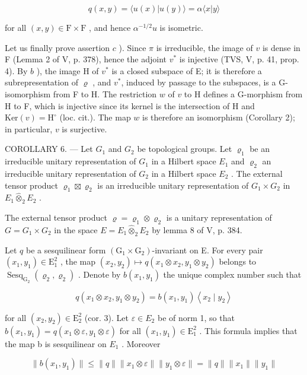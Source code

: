 \[
q (x, y) = \langle u (x) | u (y) \rangle = \alpha \langle x | y \rangle
\]

for all \((x,y)\in\mathrm{F}\times\mathrm{F}\) , and hence \(\alpha^{-1/2}u\) is isometric.

Let us finally prove assertion \(c\) ). Since \(\pi\) is irreducible, the image of \(v\) is dense in F (Lemma 2 of V, p. 378), hence the adjoint \(v^*\) is injective (TVS, V, p. 41, prop. 4). By \(b\) ), the image H of \(v^*\) is a closed subspace of E; it is therefore a subrepresentation of \(\varrho\) , and \(v^*\), induced by passage to the subspaces, is a G-isomorphism from F to H. The restriction \(w\) of \(v\) to H defines a G-morphism from H to F, which is injective since its kernel is the intersection of H and \(\text{Ker}(v) = \text{H}^\circ\) (loc. cit.). The map \(w\) is therefore an isomorphism (Corollary 2); in particular, \(v\) is surjective.

COROLLARY 6. --- Let \(G_{1}\) and \(G_{2}\) be topological groups. Let \(\varrho_{1}\) be an irreducible unitary representation of \(G_{1}\) in a Hilbert space \(E_{1}\) and \(\varrho_{2}\) an irreducible unitary representation of \(G_{2}\) in a Hilbert space \(E_{2}\) . The external tensor product \(\varrho_{1} \boxtimes \varrho_{2}\) is an irreducible unitary representation of \(G_{1} \times G_{2}\) in \(E_{1} \widehat{\otimes}_{2} E_{2}\) .

The external tensor product \(\varrho = \varrho_{1} \otimes \varrho_{2}\) is a unitary representation of \(G = G_{1} \times G_{2}\) in the space \(E = E_{1} \widehat{\otimes}_{2} E_{2}\) by lemma 8 of V, p. 384.

Let \(q\) be a sesquilinear form \((\mathrm{G}_1 \times \mathrm{G}_2)\)-invariant on E. For every pair \((x_1, y_1) \in \mathrm{E}_1^2\) , the map \((x_2, y_2) \mapsto q(x_1 \otimes x_2, y_1 \otimes y_2)\) belongs to \(\operatorname{Sesq}_{\mathrm{G}_2}(\varrho_2, \varrho_2)\) . Denote by \(b(x_1, y_1)\) the unique complex number such that

\[
q (x _ {1} \otimes x _ {2}, y _ {1} \otimes y _ {2}) = b (x _ {1}, y _ {1}) \left\langle x _ {2} \mid y _ {2} \right\rangle
\]

for all \((x_{2},y_{2})\in\mathrm{E}_{2}^{2}\) (cor. 3). Let \(\varepsilon\in E_{2}\) be of norm 1, so that \(b(x_{1},y_{1})=q(x_{1}\otimes\varepsilon,y_{1}\otimes\varepsilon)\) for all \((x_{1},y_{1})\in\mathrm{E}_{1}^{2}\) . This formula implies that the map b is sesquilinear on \(E_{1}\) . Moreover

\[
\| b (x _ {1}, y _ {1}) \| \leqslant \| q \| \| x _ {1} \otimes \varepsilon \| \| y _ {1} \otimes \varepsilon \| = \| q \| \| x _ {1} \| \| y _ {1} \|
\]

